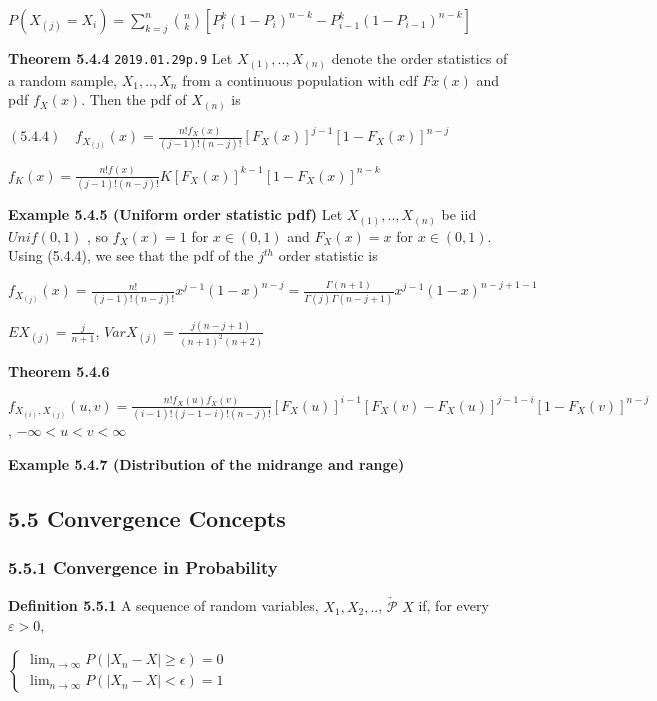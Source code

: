 \documentclass[10pt,twocolumn,portrait]{article}
\begin{document}
\(P(X_{(j)}=X_i)=\sum^n_{k=j}\binom{n}{k}[P^k_i(1-P_i)^{n-k}-P^k_{i-1}(1-P_{i-1})^{n-k}]\)

\textbf{Theorem 5.4.4}
\texttt{2019.01.29\textasciigrave{}\textasciigrave{}p.9} Let
\(X_{(1)},..,X_{(n)}\) denote the order statistics of a random sample,
\(X_1,..,X_n\) from a continuous population with cdf \(Fx (x)\) and pdf
\(f_X(x)\). Then the pdf of \(X_{(n)}\) is

\((5.4.4)\quad f_{X_{(j)}}(x)=\frac{n!f_X(x)}{(j-1)!(n-j)!}[F_X(x)]^{j-1}[1-F_X(x)]^{n-j}\)

\(f_{K}(x)=\frac{n!f(x)}{(j-1)!(n-j)!}K[F_X(x)]^{k-1}[1-F_X(x)]^{n-k}\)

\textbf{Example 5.4.5 (Uniform order statistic pdf)} Let
\(X_{(1)},..,X_{(n)}\) be iid \(Unif(0,1)\) , so \(f_X(x)=1\) for
\(x\in(0,1)\) and \(F_X(x)=x\) for \(x\in(0,1)\). Using (5.4.4), we see
that the pdf of the \(j^{th}\) order statistic is

\(f_{X_{(j)}}(x)=\frac{n!}{(j-1)!(n-j)!}x^{j-1}(1-x)^{n-j}=\frac{\Gamma(n+1)}{\Gamma(j)\Gamma(n-j+1)}x^{j-1}(1-x)^{n-j+1-1}\)

\(E{X_{(j)}}=\frac{j}{n+1}\),
\(Var{X_{(j)}}=\frac{j(n-j+1)}{(n+1)^2(n+2)}\)

\textbf{Theorem 5.4.6}

\(f_{X_{(i)},X_{(j)}}(u,v)=\frac{n!f_X(u)f_X(v)}{(i-1)!(j-1-i)!(n-j)!}[F_X(u)]^{i-1}[F_X(v)-F_X(u)]^{j-1-i}[1-F_X(v)]^{n-j}\),
\(-\infty<u<v<\infty\)

\textbf{Example 5.4.7 (Distribution of the midrange and range)}

\hypertarget{convergence-concepts}{%
\subsection{5.5 Convergence Concepts}\label{convergence-concepts}}

\hypertarget{convergence-in-probability}{%
\subsubsection{5.5.1 Convergence in
Probability}\label{convergence-in-probability}}

\textbf{Definition 5.5.1} A sequence of random variables,
\(X_1,X_2,..\), \(\underrightarrow{\mathcal{P}}\) \(X\) if, for every
\(\varepsilon>0\),

\(\begin{cases}\lim_{n\to\infty}P(|X_n-X|\ge\epsilon)=0\\\lim_{n\to\infty}P(|X_n-X|<\epsilon)=1\end{cases}\)
\end{document}
